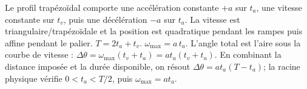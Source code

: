\begin{corrigebox}
Le profil trapézoïdal comporte une accélération constante $+a$ sur
                $t_a$, une vitesse constante sur $t_v$, puis une décélération $-a$ sur
                $t_a$. La vitesse est triangulaire/trapézoïdale et la position est
                quadratique pendant les rampes puis affine pendant le palier.
$\boxed{T=2t_a+t_v}$.
$\boxed{\omega_{\max}=a\,t_a}$.
L'angle total est l'aire sous la courbe de vitesse :
                $\boxed{\Delta\theta=\omega_{\max}(t_v+t_a)=a t_a(t_v+t_a)}$.
En combinant la distance imposée et la durée disponible, on résout
                $\Delta\theta=a t_a(T-t_a)$; la racine physique vérifie $0<t_a<T/2$,
                puis $\omega_{\max}=a t_a$.
\end{corrigebox}
